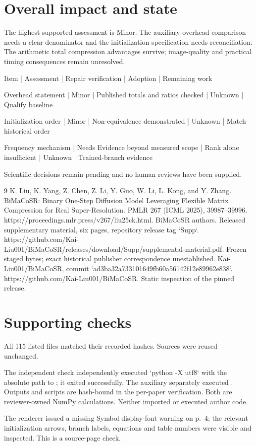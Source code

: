 \documentclass[10pt]{article}
\begin{document}
\section*{Overall impact and state}
The highest supported assessment is Minor. The auxiliary-overhead comparison needs a clear denominator and the initialization specification needs reconciliation. The arithmetic total compression advantages survive; image-quality and practical timing consequences remain unresolved.\par
Item | Assessment | Repair verification | Adoption | Remaining work\par
Overhead statement | Minor | Published totals and ratios checked | Unknown | Qualify baseline\par
Initialization order | Minor | Non-equivalence demonstrated | Unknown | Match historical order\par
Frequency mechanism | Needs Evidence beyond measured scope | Rank alone insufficient | Unknown | Trained-branch evidence\par
Scientific decisions remain pending and no human reviews have been supplied.\par
9 K. Liu, K. Yang, Z. Chen, Z. Li, Y. Guo, W. Li, L. Kong, and Y. Zhang. BiMaCoSR: Binary One-Step Diffusion Model Leveraging Flexible Matrix Compression for Real Super-Resolution. PMLR 267 (ICML 2025), 39987–39996. https://proceedings.mlr.press/v267/liu25ck.html. BiMaCoSR authors. Released supplementary material, six pages, repository release tag `Supp`. https://github.com/Kai-Liu001/BiMaCoSR/releases/download/Supp/supplemental-material.pdf. Frozen staged bytes; exact historical publisher correspondence unestablished. Kai-Liu001/BiMaCoSR, commit `ad3ba32a733101649fb60a56142f12e89962e838`. https://github.com/Kai-Liu001/BiMaCoSR. Static inspection of the pinned release.\par
\section*{Supporting checks}
All 115 listed files matched their recorded hashes. Sources were reused unchanged.\par
The independent check independently executed `python -X utf8` with the absolute path to ; it exited successfully. The auxiliary separately executed . Outputs and scripts are hash-bound in the per-paper verification. Both are reviewer-owned NumPy calculations. Neither imported or executed author code.\par
The renderer issued a missing Symbol display-font warning on p. 4; the relevant initialization arrows, branch labels, equations and table numbers were visible and inspected. This is a source-page check.\par
\end{document}
